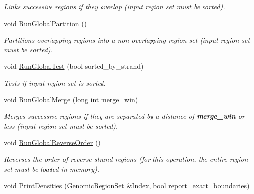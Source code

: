 \begin{CompactItemize}
\begin{CompactList}\small\item\em Links successive regions if they overlap (input region set must be sorted). \item\end{CompactList}\item 
\hypertarget{classGenomicRegionSet_40dd79548f9d0333f1169bd17a6e9465}{
void \hyperlink{classGenomicRegionSet_40dd79548f9d0333f1169bd17a6e9465}{RunGlobalPartition} ()}
\label{classGenomicRegionSet_40dd79548f9d0333f1169bd17a6e9465}

\begin{CompactList}\small\item\em Partitions overlapping regions into a non-overlapping region set (input region set must be sorted). \item\end{CompactList}\item 
\hypertarget{classGenomicRegionSet_83853c6af4b779a37de284751d09348d}{
void \hyperlink{classGenomicRegionSet_83853c6af4b779a37de284751d09348d}{RunGlobalTest} (bool sorted\_\-by\_\-strand)}
\label{classGenomicRegionSet_83853c6af4b779a37de284751d09348d}

\begin{CompactList}\small\item\em Tests if input region set is sorted. \item\end{CompactList}\item 
\hypertarget{classGenomicRegionSet_53885e10c5dc9aa51ebece77dae63313}{
void \hyperlink{classGenomicRegionSet_53885e10c5dc9aa51ebece77dae63313}{RunGlobalMerge} (long int merge\_\-win)}
\label{classGenomicRegionSet_53885e10c5dc9aa51ebece77dae63313}

\begin{CompactList}\small\item\em Merges successive regions if they are separated by a distance of {\bf merge\_\-win} or less (input region set must be sorted). \item\end{CompactList}\item 
\hypertarget{classGenomicRegionSet_962bb1b26543df14b324d7ab4dd8e404}{
void \hyperlink{classGenomicRegionSet_962bb1b26543df14b324d7ab4dd8e404}{RunGlobalReverseOrder} ()}
\label{classGenomicRegionSet_962bb1b26543df14b324d7ab4dd8e404}

\begin{CompactList}\small\item\em Reverses the order of reverse-strand regions (for this operation, the entire region set must be loaded in memory). \item\end{CompactList}\item 
\hypertarget{classGenomicRegionSet_b8abdbc3c1f4530dc1992fb0766ba5a4}{
void \hyperlink{classGenomicRegionSet_b8abdbc3c1f4530dc1992fb0766ba5a4}{PrintDensities} (\hyperlink{classGenomicRegionSet}{GenomicRegionSet} \&Index, bool report\_\-exact\_\-boundaries)}
\label{classGenomicRegionSet_b8abdbc3c1f4530dc1992fb0766ba5a4}


\end{CompactItemize}
